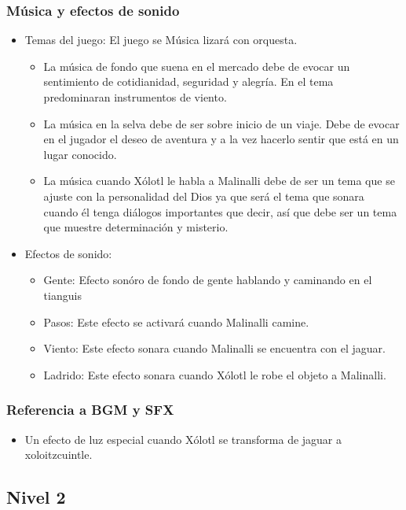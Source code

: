 \documentclass[11pt,letterpaper]{article}
\begin{document}
\subsubsection{Música y efectos de sonido}
\begin{itemize} 
\item Temas del juego: El juego se Música lizará con orquesta.
\begin{itemize}
		\item La música de fondo que suena en el mercado debe de evocar un sentimiento de cotidianidad, seguridad y alegría. En el tema predominaran instrumentos de viento.
		\item La música en la selva debe de ser sobre inicio de un viaje. Debe de evocar en el jugador el deseo de aventura y a la vez hacerlo sentir que está en un lugar conocido.
		\item La música cuando Xólotl le habla a Malinalli debe de ser un tema que se ajuste con la personalidad del Dios ya que será el tema que sonara cuando él tenga diálogos importantes que decir, así que debe ser un tema que muestre determinación y misterio.
\end{itemize} 
\item Efectos de sonido:
	\begin{itemize}
		\item Gente: Efecto sonóro de fondo de gente hablando y caminando en el tianguis
		\item Pasos: Este efecto se activará cuando Malinalli camine.
		\item Viento: Este efecto sonara cuando Malinalli se encuentra con el jaguar.
		\item Ladrido: Este efecto sonara cuando Xólotl le robe el objeto a Malinalli.
\end{itemize}
\end{itemize}
\subsubsection{Referencia a BGM y SFX}
\begin{itemize}
	\item Un efecto de luz especial cuando Xólotl se transforma de jaguar a xoloitzcuintle.

\end{itemize}



	
		\subsection{Nivel 2}
\end{document}
